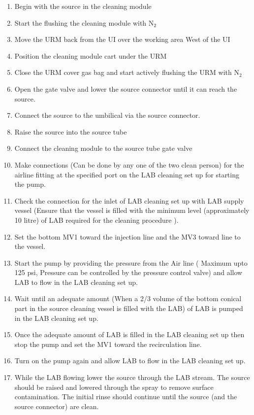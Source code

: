 \begin{enumerate}
\item Begin with the source in the cleaning module
\item Start the flushing the cleaning module with N$_{2}$ 
\item Move the URM back from the UI over the working area West of the UI
\item Position the cleaning module cart under the URM
\item Close the URM cover gas bag and start actively flushing the URM with N$_{2}$
\item Open the gate valve and lower the source connector until it can reach the source.
\item Connect the source to the umbilical via the source connector. 
\item Raise the source into the source tube
\item Connect the cleaning module to the source tube gate valve
\item Make connections (Can be done by any one of the two clean person) for the  airline fitting at the specified port on the  LAB cleaning set up for starting the pump.
\item Check the connection for the inlet of LAB cleaning set up with LAB supply vessel (Ensure that the vessel  is filled with the minimum level (approximately 10 litre) of LAB required for the cleaning procedure ).
\item Set the bottom MV1  toward the injection line and the MV3 toward  line to the vessel.
\item Start the pump by providing the pressure from the Air line ( Maximum upto 125 psi, Pressure can be controlled by the pressure control valve) and allow LAB to flow in the LAB cleaning set up.
\item Wait until an adequate amount (When a 2/3 volume of the bottom conical part in the source cleaning vessel is filled with the LAB) of LAB is pumped in the LAB cleaning set up.
\item Once the adequate amount of LAB is filled  in the LAB cleaning set up then stop the pump and set the MV1 toward the recirculation line.
\item Turn on the pump again and allow LAB to flow in the LAB cleaning set up.
\item While the LAB flowing  lower the source through the LAB stream. The source should be  raised and lowered through the spray to remove surface contamination. The initial rinse should continue until the source (and the source connector) are clean.

\end{enumerate}
